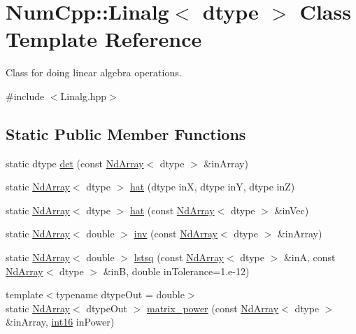 \hypertarget{class_num_cpp_1_1_linalg}{}\section{Num\+Cpp\+:\+:Linalg$<$ dtype $>$ Class Template Reference}
\label{class_num_cpp_1_1_linalg}


Class for doing linear algebra operations.  




{\ttfamily \#include $<$Linalg.\+hpp$>$}

\subsection*{Static Public Member Functions}
\begin{DoxyCompactItemize}
\item 
static dtype \mbox{\hyperlink{class_num_cpp_1_1_linalg_ad6b31282e14b4d7428292c06dc96e812}{det}} (const \mbox{\hyperlink{class_num_cpp_1_1_nd_array}{Nd\+Array}}$<$ dtype $>$ \&in\+Array)
\item 
static \mbox{\hyperlink{class_num_cpp_1_1_nd_array}{Nd\+Array}}$<$ dtype $>$ \mbox{\hyperlink{class_num_cpp_1_1_linalg_a232f2a1ab68c5b26411b12b59ef4a521}{hat}} (dtype inX, dtype inY, dtype inZ)
\item 
static \mbox{\hyperlink{class_num_cpp_1_1_nd_array}{Nd\+Array}}$<$ dtype $>$ \mbox{\hyperlink{class_num_cpp_1_1_linalg_aac0a291ef1c7fb178530b432405d331c}{hat}} (const \mbox{\hyperlink{class_num_cpp_1_1_nd_array}{Nd\+Array}}$<$ dtype $>$ \&in\+Vec)
\item 
static \mbox{\hyperlink{class_num_cpp_1_1_nd_array}{Nd\+Array}}$<$ double $>$ \mbox{\hyperlink{class_num_cpp_1_1_linalg_ab800e3d60c0290b5355fc2caa71f3365}{inv}} (const \mbox{\hyperlink{class_num_cpp_1_1_nd_array}{Nd\+Array}}$<$ dtype $>$ \&in\+Array)
\item 
static \mbox{\hyperlink{class_num_cpp_1_1_nd_array}{Nd\+Array}}$<$ double $>$ \mbox{\hyperlink{class_num_cpp_1_1_linalg_a92127eb11ad68e68d69b147bce317ffe}{lstsq}} (const \mbox{\hyperlink{class_num_cpp_1_1_nd_array}{Nd\+Array}}$<$ dtype $>$ \&inA, const \mbox{\hyperlink{class_num_cpp_1_1_nd_array}{Nd\+Array}}$<$ dtype $>$ \&inB, double in\+Tolerance=1.e-\/12)
\item 
{\footnotesize template$<$typename dtype\+Out  = double$>$ }\\static \mbox{\hyperlink{class_num_cpp_1_1_nd_array}{Nd\+Array}}$<$ dtype\+Out $>$ \mbox{\hyperlink{class_num_cpp_1_1_linalg_abab83ff2a0d7fbf95995f5abed3e4951}{matrix\+\_\+power}} (const \mbox{\hyperlink{class_num_cpp_1_1_nd_array}{Nd\+Array}}$<$ dtype $>$ \&in\+Array, \mbox{\hyperlink{namespace_num_cpp_a4cf8a907fdc869d71f98ca69efb7ea09}{int16}} in\+Power)

\end{DoxyCompactItemize}
